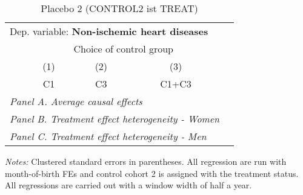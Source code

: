 \begin{table}[H] \centering \begin{threeparttable} \caption{Placebo 2 (CONTROL2 ist TREAT) } {\def\sym#1{\ifmmode^{#1}\else\(^{#1}\)\fi} \begin{tabular}{l*{4}{c}} \toprule \multicolumn{4}{l}{Dep. variable: \textbf{Non-ischemic heart diseases}} \\ & \multicolumn{3}{c}{Choice of control group} \\ \cmidrule(lr){2-4}
            &\multicolumn{1}{c}{(1)}&\multicolumn{1}{c}{(2)}&\multicolumn{1}{c}{(3)}\\
            &\multicolumn{1}{c}{C1}&\multicolumn{1}{c}{C3}&\multicolumn{1}{c}{C1+C3}\\
\midrule
 \multicolumn{4}{l}{\emph{Panel A. Average causal effects}} \\      \midrule\multicolumn{4}{l}{\emph{Panel B. Treatment effect heterogeneity - Women}} \\      \midrule\multicolumn{4}{l}{\emph{Panel C. Treatment effect heterogeneity - Men}} \\      
\bottomrule \end{tabular} } \begin{tablenotes} \item \scriptsize \emph{Notes:} Clustered standard errors in parentheses. All regression are run with month-of-birth FEs and control cohort 2 is assigned with the treatment status. All regressions are carried out with a window width of half a year. \end{tablenotes} \end{threeparttable} \end{table} 
